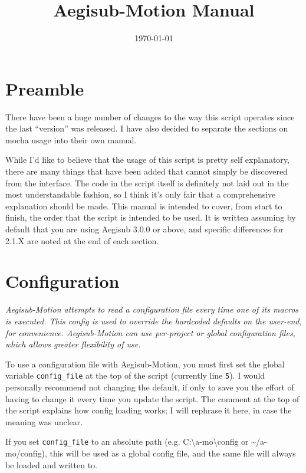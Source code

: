 ﻿\documentclass[a4paper,12pt]{article}
\title{Aegisub-Motion Manual}
\author{}
\date{\today}
\begin{document}
  \maketitle
  \tableofcontents
  \newpage
  \section{Preamble}
  There have been a huge number of changes to the way this script operates since the last ``version'' was released. I have also decided to separate the sections on mocha usage into their own manual.
  
  While I'd like to believe that the usage of this script is pretty self explanatory, there are many things that have been added that cannot simply be discovered from the interface. The code in the script itself is definitely not laid out in the most understandable fashion, so I think it's only fair that a comprehensive explanation should be made. This manual is intended to cover, from start to finish, the order that the script is intended to be used. It is written assuming by default that you are using Aegisub 3.0.0 or above, and specific differences for 2.1.X are noted at the end of each section.

  \section{Configuration}
  \emph{Aegisub-Motion attempts to read a configuration file every time one of its macros is executed. This config is used to override the hardcoded defaults on the user-end, for convenience. Aegisub-Motion can use per-project or global configuration files, which allows greater flexibility of use.}

  \medskip

  To use a configuration file with Aegisub-Motion, you must first set the global variable {\tt config\_file} at the top of the script (currently line {\tt5}). I would personally recommend not changing the default, if only to save you the effort of having to change it every time you update the script. The comment at the top of the script explains how config loading works; I will rephrase it here, in case the meaning was unclear.
  
  If you set {\tt{}config\_file} to an absolute path (e.g. C:\textbackslash{}a-mo\textbackslash{}config or \textasciitilde/a-mo/config), this will be used as a global config file, and the same file will always be loaded and written to.
  
\end{document}
